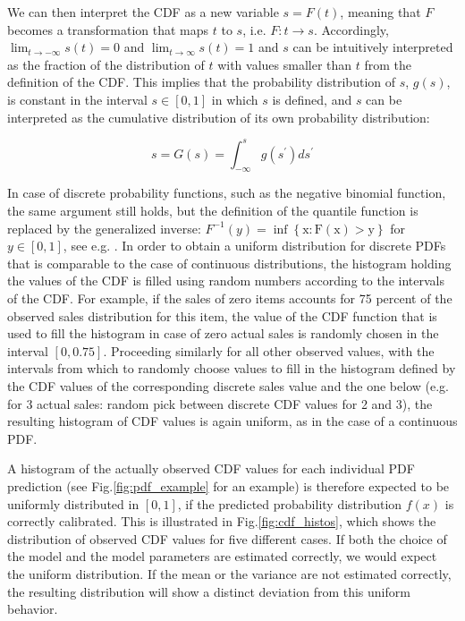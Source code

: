 \documentclass[BCOR=1mm, DIV=calc,10pt,
twoside=true,
twocolumn,
headings=normal]{scrartcl}
\newcommand{\fig}{Fig.}
\begin{document}
We can then interpret the CDF as a new variable $s = F(t)$, meaning that $F$ becomes a transformation that maps $t$ to $s$, i.e. $F:t \to s$. Accordingly,  $\lim_{t \to -\infty}s(t) = 0$ and $\lim_{t \to \infty}s(t) = 1$ and $s$ can be intuitively interpreted as the fraction of the distribution of $t$ with values smaller than $t$ from the definition of the CDF. This implies that the probability distribution of $s$, $g(s)$, is constant in the interval $s \in [0,1]$ in which $s$ is defined, and $s$ can be interpreted as the cumulative distribution of its own probability distribution:

\begin{equation}
s = G(s) = \int_{-\infty}^{s} g(s^\prime) ds^\prime
\end{equation}

In case of discrete probability functions, such as the negative binomial function, the same argument still holds, but the definition of the quantile function is replaced by the generalized inverse: $F^{-1}(y) = \mathrm{\inf \left \{x : F(x)>y\right  \} }$ for $y \in [0,1]$, see e.g. \cite[p. 54]{casella2002statistical}. In order to obtain a uniform distribution for discrete PDFs that is comparable to the case of continuous distributions, the histogram holding the values of the CDF is filled using random numbers according to the intervals of the CDF. For example, if the sales of zero items accounts for 75 percent of the observed sales distribution for this item, the value of the CDF function that is used to fill the histogram in case of zero actual sales is randomly chosen in the interval $[0, 0.75]$. Proceeding similarly for all other observed values, with the intervals from which to randomly choose values to fill in the histogram defined by the CDF values of the corresponding discrete sales value and the one below (e.g. for 3 actual sales: random pick between discrete CDF values for 2 and 3), the resulting histogram of CDF values is again uniform, as in the case of a continuous PDF.

A histogram of the actually observed CDF values for each individual PDF prediction (see \fig \ref{fig:pdf_example} for an example) is therefore expected to be uniformly distributed in $[0,1]$, if the predicted probability distribution $f(x)$ is correctly calibrated. This is illustrated in \fig \ref{fig:cdf_histos}, which shows the distribution of observed CDF values for five different cases. If both the choice of the model and the model parameters are estimated correctly, we would expect the uniform distribution. If the mean or the variance are not estimated correctly, the resulting distribution will show a distinct deviation from this uniform behavior.
\end{document}
